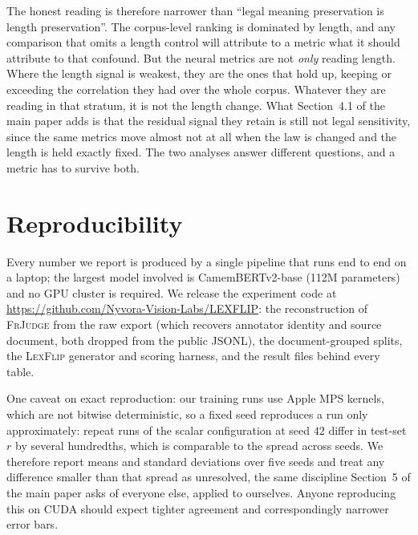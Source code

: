 \documentclass[11pt]{article}
\begin{document}
The honest reading is therefore narrower than ``legal meaning preservation is
length preservation''. The corpus-level ranking is dominated by length, and any
comparison that omits a length control will attribute to a metric what it should
attribute to that confound. But the neural metrics are not \emph{only} reading
length. Where the length signal is weakest, they are the ones that hold up, keeping or
exceeding the correlation they had over the whole corpus. Whatever they are
reading in that stratum, it is not the length change. What
Section~4.1 of the main paper adds is that the residual signal they retain is still not
legal sensitivity, since the same metrics move almost not at all when the law is
changed and the length is held exactly fixed. The two analyses answer different
questions, and a metric has to survive both.

\section{Reproducibility}
\label{app:repro}

Every number we report is produced by a single pipeline that runs end to end
on a laptop; the largest model involved is CamemBERTv2-base (112M parameters)
and no GPU cluster is required. We release the experiment code at
\url{https://github.com/Nyvora-Vision-Labs/LEXFLIP}: the
reconstruction of \textsc{FrJudge} from the raw export (which recovers annotator
identity and source document, both dropped from the public JSONL), the
document-grouped splits, the \textsc{LexFlip} generator and scoring harness,
and the result files behind every table.

One caveat on exact reproduction: our training runs use Apple MPS kernels, which
are not bitwise deterministic, so a fixed seed reproduces a run only
approximately: repeat runs of the scalar configuration at seed $42$ differ in
test-set $r$ by several hundredths, which is comparable to the spread across
seeds. We therefore report means and standard deviations over five seeds and
treat any difference smaller than that spread as unresolved, the same discipline
Section~5 of the main paper asks of everyone else, applied to ourselves. Anyone
reproducing this on CUDA should expect tighter agreement and correspondingly
narrower error bars.
\end{document}
